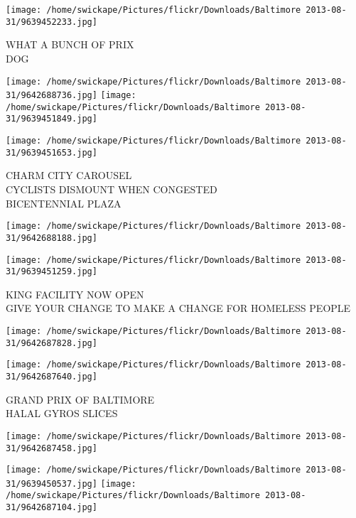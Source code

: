 \documentclass[10pt,letterpaper]{article}
\begin{document}
\vspace{0.25in}
\texttt{[image: /home/swickape/Pictures/flickr/Downloads/Baltimore 2013-08-31/9639452233.jpg]}

WHAT A BUNCH OF PRIX\\
DOG\\
\pagebreak

\texttt{[image: /home/swickape/Pictures/flickr/Downloads/Baltimore 2013-08-31/9642688736.jpg]}
\texttt{[image: /home/swickape/Pictures/flickr/Downloads/Baltimore 2013-08-31/9639451849.jpg]}

\texttt{[image: /home/swickape/Pictures/flickr/Downloads/Baltimore 2013-08-31/9639451653.jpg]}

CHARM CITY CAROUSEL\\
CYCLISTS DISMOUNT WHEN CONGESTED\\
BICENTENNIAL PLAZA\\
\pagebreak

\texttt{[image: /home/swickape/Pictures/flickr/Downloads/Baltimore 2013-08-31/9642688188.jpg]}

\vspace{0.25in}
\texttt{[image: /home/swickape/Pictures/flickr/Downloads/Baltimore 2013-08-31/9639451259.jpg]}

KING FACILITY NOW OPEN\\
GIVE YOUR CHANGE TO MAKE A CHANGE FOR HOMELESS PEOPLE\\
\pagebreak

\texttt{[image: /home/swickape/Pictures/flickr/Downloads/Baltimore 2013-08-31/9642687828.jpg]}

\vspace{0.25in}
\texttt{[image: /home/swickape/Pictures/flickr/Downloads/Baltimore 2013-08-31/9642687640.jpg]}

GRAND PRIX OF BALTIMORE\\
HALAL GYROS SLICES\\
\pagebreak

\texttt{[image: /home/swickape/Pictures/flickr/Downloads/Baltimore 2013-08-31/9642687458.jpg]}

\vspace{0.25in}
\texttt{[image: /home/swickape/Pictures/flickr/Downloads/Baltimore 2013-08-31/9639450537.jpg]}
\texttt{[image: /home/swickape/Pictures/flickr/Downloads/Baltimore 2013-08-31/9642687104.jpg]}
\end{document}
